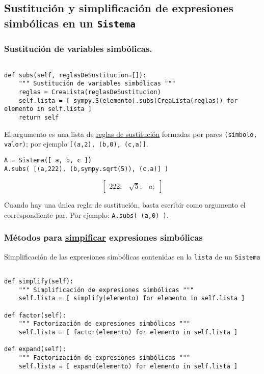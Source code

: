 \documentclass[11pt]{report}
\begin{document}
\subsection{Sustitución y simplificación de expresiones simbólicas en un \texttt{Sistema}}
\label{sec:org96b0a35}

\subsubsection{Sustitución de variables simbólicas.}
\label{sec:org90e10d1}

\begin{verbatim}

def subs(self, reglasDeSustitucion=[]):
    """ Sustitución de variables simbólicas """
    reglas = CreaLista(reglasDeSustitucion)
    self.lista = [ sympy.S(elemento).subs(CreaLista(reglas)) for elemento in self.lista ]
    return self

\end{verbatim}

El argumento es una lista de \href{https://docs.sympy.org/latest/tutorials/intro-tutorial/basic\_operations.html}{reglas de sustitución} formadas por pares
\texttt{(símbolo, valor)}; por ejemplo \texttt{[(a,2), (b,0), (c,a)]}.

\begin{verbatim}
A = Sistema([ a, b, c ])
A.subs( [(a,222), (b,sympy.sqrt(5)), (c,a)] )
\end{verbatim}

$$\left[ \begin{array}{ccc}222;& \sqrt{5};& a;\end{array} \right]$$

Cuando hay una única regla de sustitución, basta escribir como
argumento el correspondiente par. Por ejemplo: \texttt{A.subs( (a,0) )}.

\subsubsection{Métodos para \href{https://docs.sympy.org/latest/tutorials/intro-tutorial/simplification.html}{simpificar} expresiones simbólicas}
\label{sec:org05a1ebe}

Simplificación de las expresiones simbólicas contenidas en la \texttt{lista} de un \texttt{Sistema}

\begin{verbatim}

def simplify(self):
    """ Simplificación de expresiones simbólicas """
    self.lista = [ simplify(elemento) for elemento in self.lista ]
                                                               
def factor(self):
    """ Factorización de expresiones simbólicas """
    self.lista = [ factor(elemento) for elemento in self.lista ]

def expand(self):
    """ Factorización de expresiones simbólicas """
    self.lista = [ expand(elemento) for elemento in self.lista ]

\end{verbatim}
\end{document}
